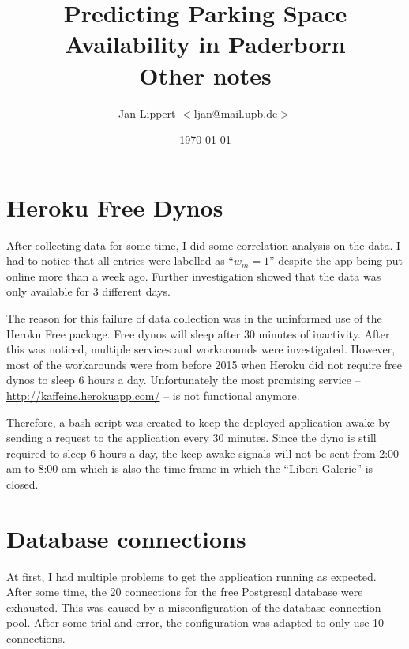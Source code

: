 \documentclass[journal,10pt]{IEEEtran}
\title{Predicting Parking Space Availability in Paderborn\\
Other notes}
\author{Jan Lippert \(<\)\href{mailt:ljan@mail.upb.de}{ljan@mail.upb.de}\(>\)}
\date{\today}
\newcommand{\wom}{w_m}
\begin{document}
\maketitle


\section{Heroku Free Dynos}
After collecting data for some time, I did some correlation analysis on the data. I had to notice that all entries were labelled as ``\(\wom = 1\)'' despite the app being put online more than a week ago. Further investigation showed that the data was only available for 3 different days. 

The reason for this failure of data collection was in the uninformed use of the Heroku Free package. Free dynos will sleep after 30 minutes of inactivity. After this was noticed, multiple services and workarounds were investigated. However, most of the workarounds were from before 2015 when Heroku did not require free dynos to sleep 6 hours a day. Unfortunately the most promising service -- \url{http://kaffeine.herokuapp.com/} -- is not functional anymore.

Therefore, a bash script was created to keep the deployed application awake by sending a request to the application every 30 minutes. Since the dyno is still required to sleep 6 hours a day, the keep-awake signals will not be sent from 2:00 am to 8:00 am which is also the time frame in which the ``Libori-Galerie'' is closed.

\section{Database connections}
At first, I had multiple problems to get the application running as expected. After some time, the 20 connections for the free Postgresql database were exhausted. This was caused by a misconfiguration of the database connection pool. After some trial and error, the configuration was adapted to only use 10 connections.

  
\end{document}
